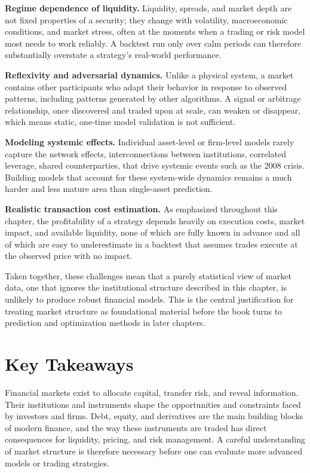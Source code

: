 \documentclass[../ai_in_finance]{subfiles}
\begin{document}
\textbf{Regime dependence of liquidity.} Liquidity, spreads, and market depth are not fixed properties of a security; they change with volatility, macroeconomic conditions, and market stress, often at the moments when a trading or risk model most needs to work reliably. A backtest run only over calm periods can therefore substantially overstate a strategy's real-world performance.

\textbf{Reflexivity and adversarial dynamics.} Unlike a physical system, a market contains other participants who adapt their behavior in response to observed patterns, including patterns generated by other algorithms. A signal or arbitrage relationship, once discovered and traded upon at scale, can weaken or disappear, which means static, one-time model validation is not sufficient.

\textbf{Modeling systemic effects.} Individual asset-level or firm-level models rarely capture the network effects, interconnections between institutions, correlated leverage, shared counterparties, that drive systemic events such as the 2008 crisis. Building models that account for these system-wide dynamics remains a much harder and less mature area than single-asset prediction.

\textbf{Realistic transaction cost estimation.} As emphasized throughout this chapter, the profitability of a strategy depends heavily on execution costs, market impact, and available liquidity, none of which are fully known in advance and all of which are easy to underestimate in a backtest that assumes trades execute at the observed price with no impact.

Taken together, these challenges mean that a purely statistical view of market data, one that ignores the institutional structure described in this chapter, is unlikely to produce robust financial models. This is the central justification for treating market structure as foundational material before the book turns to prediction and optimization methods in later chapters.

\section{Key Takeaways}

Financial markets exist to allocate capital, transfer risk, and reveal information. Their institutions and instruments shape the opportunities and constraints faced by investors and firms. Debt, equity, and derivatives are the main building blocks of modern finance, and the way these instruments are traded has direct consequences for liquidity, pricing, and risk management. A careful understanding of market structure is therefore necessary before one can evaluate more advanced models or trading strategies.
\end{document}
